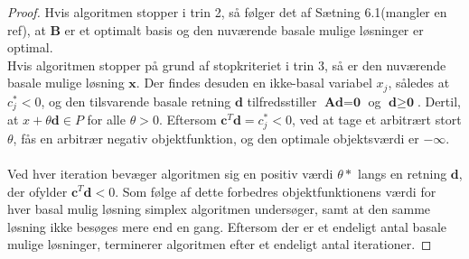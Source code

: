 \begin{proof}
Hvis algoritmen stopper i trin 2, så følger det af Sætning 6.1(mangler en ref), at $\textbf{B}$ er et optimalt basis og den nuværende basale mulige løsninger er optimal.
\\
Hvis algoritmen stopper på grund af stopkriteriet i trin $3$, så er den nuværende basale mulige løsning $\textbf{x}$. 
Der findes desuden en ikke-basal variabel $x_j$, således at $c^*_j<0$, og den tilsvarende basale retning $\textbf{d}$ tilfredsstiller $\textbf{Ad}=\textbf{0}$ og $\textbf{d} \geq \textbf{0}$. 
Dertil, at $x+\theta \textbf{d}\in P$ for alle $\theta>0$. 
Eftersom $\textbf{c}^T\textbf{d}=c_j^*<0$, ved at tage et arbitrært stort $\theta$, fås en arbitrær negativ objektfunktion, og den optimale objektsværdi er $-\infty$.
\\\\
Ved hver iteration bevæger algoritmen sig en positiv værdi $\theta*$ langs en retning $\textbf{d}$, der ofylder $\textbf{c}^T\textbf{d}<0$. 
Som følge af dette forbedres objektfunktionens værdi for hver basal mulig løsning simplex algoritmen undersøger, samt at den samme løsning ikke besøges mere end en gang. 
Eftersom der er et endeligt antal basale mulige løsninger, terminerer algoritmen efter et endeligt antal iterationer.
\end{proof}
%
